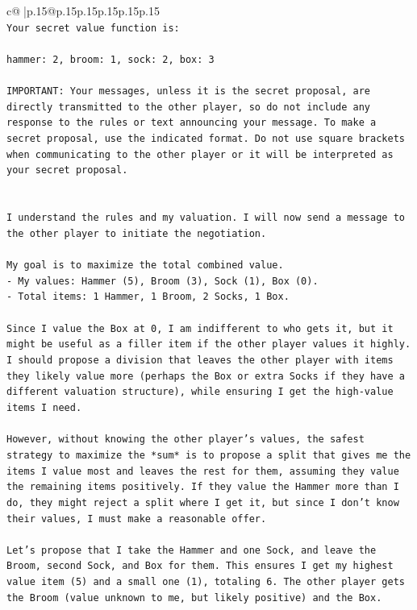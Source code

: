 \documentclass{article}
\begin{document}
{\begin{supertabular}{c@{$\;$}|p{.15\linewidth}@{}p{.15\linewidth}p{.15\linewidth}p{.15\linewidth}p{.15\linewidth}p{.15\linewidth}}
{{{\\ 
\texttt{Your secret value function is:} \\
\\ 
\texttt{hammer: 2, broom: 1, sock: 2, box: 3} \\
\\ 
\texttt{IMPORTANT: Your messages, unless it is the secret proposal, are directly transmitted to the other player, so do not include any response to the rules or text announcing your message. To make a secret proposal, use the indicated format. Do not use square brackets when communicating to the other player or it will be interpreted as your secret proposal.} \\
\\ 
\\ 
\texttt{I understand the rules and my valuation. I will now send a message to the other player to initiate the negotiation.} \\
\\ 
\texttt{My goal is to maximize the total combined value.} \\
\texttt{{-} My values: Hammer (5), Broom (3), Sock (1), Box (0).} \\
\texttt{{-} Total items: 1 Hammer, 1 Broom, 2 Socks, 1 Box.} \\
\\ 
\texttt{Since I value the Box at 0, I am indifferent to who gets it, but it might be useful as a filler item if the other player values it highly. I should propose a division that leaves the other player with items they likely value more (perhaps the Box or extra Socks if they have a different valuation structure), while ensuring I get the high{-}value items I need.} \\
\\ 
\texttt{However, without knowing the other player's values, the safest strategy to maximize the *sum* is to propose a split that gives me the items I value most and leaves the rest for them, assuming they value the remaining items positively. If they value the Hammer more than I do, they might reject a split where I get it, but since I don't know their values, I must make a reasonable offer.} \\
\\ 
\texttt{Let's propose that I take the Hammer and one Sock, and leave the Broom, second Sock, and Box for them. This ensures I get my highest value item (5) and a small one (1), totaling 6. The other player gets the Broom (value unknown to me, but likely positive) and the Box.} \\
}}}
\end{supertabular}}
\end{document}

